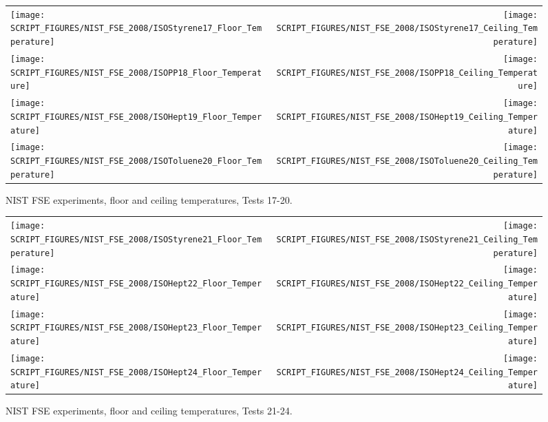 \begin{figure}[p]
\begin{tabular*}{\textwidth}{l@{\extracolsep{\fill}}r}
\texttt{[image: SCRIPT\_FIGURES/NIST\_FSE\_2008/ISOStyrene17\_Floor\_Temperature]} &
\texttt{[image: SCRIPT\_FIGURES/NIST\_FSE\_2008/ISOStyrene17\_Ceiling\_Temperature]} \\
\texttt{[image: SCRIPT\_FIGURES/NIST\_FSE\_2008/ISOPP18\_Floor\_Temperature]} &
\texttt{[image: SCRIPT\_FIGURES/NIST\_FSE\_2008/ISOPP18\_Ceiling\_Temperature]} \\
\texttt{[image: SCRIPT\_FIGURES/NIST\_FSE\_2008/ISOHept19\_Floor\_Temperature]} &
\texttt{[image: SCRIPT\_FIGURES/NIST\_FSE\_2008/ISOHept19\_Ceiling\_Temperature]} \\
\texttt{[image: SCRIPT\_FIGURES/NIST\_FSE\_2008/ISOToluene20\_Floor\_Temperature]} &
\texttt{[image: SCRIPT\_FIGURES/NIST\_FSE\_2008/ISOToluene20\_Ceiling\_Temperature]}
\end{tabular*}
\caption{NIST FSE experiments, floor and ceiling temperatures, Tests 17-20.}
\label{NIST_FSE_2008_Surface_Temp_4}
\end{figure}

\begin{figure}[p]
\begin{tabular*}{\textwidth}{l@{\extracolsep{\fill}}r}
\texttt{[image: SCRIPT\_FIGURES/NIST\_FSE\_2008/ISOStyrene21\_Floor\_Temperature]} &
\texttt{[image: SCRIPT\_FIGURES/NIST\_FSE\_2008/ISOStyrene21\_Ceiling\_Temperature]} \\
\texttt{[image: SCRIPT\_FIGURES/NIST\_FSE\_2008/ISOHept22\_Floor\_Temperature]} &
\texttt{[image: SCRIPT\_FIGURES/NIST\_FSE\_2008/ISOHept22\_Ceiling\_Temperature]} \\
\texttt{[image: SCRIPT\_FIGURES/NIST\_FSE\_2008/ISOHept23\_Floor\_Temperature]} &
\texttt{[image: SCRIPT\_FIGURES/NIST\_FSE\_2008/ISOHept23\_Ceiling\_Temperature]} \\
\texttt{[image: SCRIPT\_FIGURES/NIST\_FSE\_2008/ISOHept24\_Floor\_Temperature]} &
\texttt{[image: SCRIPT\_FIGURES/NIST\_FSE\_2008/ISOHept24\_Ceiling\_Temperature]}
\end{tabular*}
\caption{NIST FSE experiments, floor and ceiling temperatures, Tests 21-24.}
\label{NIST_FSE_2008_Surface_Temp_5}
\end{figure}

